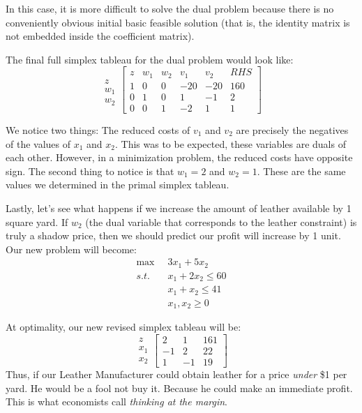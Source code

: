 In this case, it is more difficult to solve the dual problem because there is no conveniently obvious initial basic feasible solution (that is, the identity matrix is not embedded inside the coefficient matrix). 

The final full simplex tableau for the dual problem would look like:
\begin{displaymath}
\begin{array}{c}
\\
z\\w_1\\w_2
\end{array}
\left[\begin{array}{c|cccc|c}
z & 	w_1 &	w_2 & 	v_1 &	v_2 & 	RHS\\
\hline
1 & 	0 & 	0 & 	-20 & 	-20 & 	160\\
\hline
0 &  	1 & 	0 & 	1 & 	-1 & 	2\\
0 & 	0 & 	1 & 	-2 & 	1 & 	1
\end{array}\right]
\end{displaymath}

We notice two things: The reduced costs of $v_1$ and $v_2$ are precisely the negatives of the values of $x_1$ and $x_2$. This was to be expected, these variables are duals of each other. However, in a minimization problem, the reduced costs have opposite sign. The second thing to notice is that $w_1 = 2$ and $w_2 = 1$. These are the same values we determined in the primal simplex tableau.

Lastly, let's see what happens if we increase the amount of leather available by 1 square yard. If $w_2$ (the dual variable that corresponds to the leather constraint) is truly a shadow price, then we should predict our profit will increase by 1 unit. Our new problem will become:
\begin{displaymath}
\begin{aligned}
\max\;\; & 3x_1 + 5x_2\\
s.t.\;\; & x_1 + 2x_2 \leq 60\\
& x_1 + x_2 \leq 41\\
& x_1, x_2 \geq 0
\end{aligned}
\end{displaymath}

At optimality, our new revised simplex tableau will be:
\begin{displaymath}
\begin{array}{c}
z\\
x_1\\
x_2
\end{array}
\left[
\begin{array}{cc|c}
2	&	1	&	161\\
\hline
-1	&	2	&	22\\
1	&	-1	&	19
\end{array}
\right]
\end{displaymath}
Thus, if our Leather Manufacturer could obtain leather for a price \textit{under} \$1 per yard. He would be a fool not buy it. Because he could make an immediate profit. This is what economists call \textit{thinking at the margin}. 


